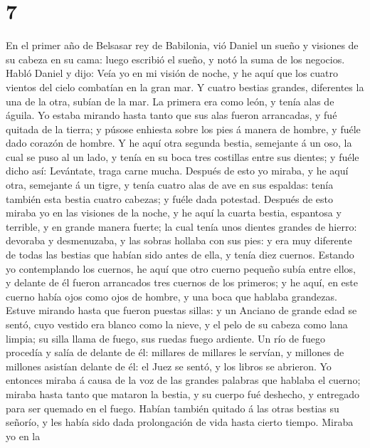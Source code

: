 \hypertarget{section-6}{%
\section{7}\label{section-6}}

 En el primer año de Belsasar rey de Babilonia, vió Daniel
un sueño y visiones de su cabeza en su cama: luego escribió el sueño, y
notó la suma de los negocios.  Habló Daniel y dijo: Veía yo
en mi visión de noche, y he aquí que los cuatro vientos del cielo
combatían en la gran mar.  Y cuatro bestias grandes,
diferentes la una de la otra, subían de la mar.  La primera
era como león, y tenía alas de águila. Yo estaba mirando hasta tanto que
sus alas fueron arrancadas, y fué quitada de la tierra; y púsose
enhiesta sobre los pies á manera de hombre, y fuéle dado corazón de
hombre.  Y he aquí otra segunda bestia, semejante á un oso,
la cual se puso al un lado, y tenía en su boca tres costillas entre sus
dientes; y fuéle dicho así: Levántate, traga carne mucha. 
Después de esto yo miraba, y he aquí otra, semejante á un tigre, y tenía
cuatro alas de ave en sus espaldas: tenía también esta bestia cuatro
cabezas; y fuéle dada potestad.  Después de esto miraba yo
en las visiones de la noche, y he aquí la cuarta bestia, espantosa y
terrible, y en grande manera fuerte; la cual tenía unos dientes grandes
de hierro: devoraba y desmenuzaba, y las sobras hollaba con sus pies: y
era muy diferente de todas las bestias que habían sido antes de ella, y
tenía diez cuernos.  Estando yo contemplando los cuernos, he
aquí que otro cuerno pequeño subía entre ellos, y delante de él fueron
arrancados tres cuernos de los primeros; y he aquí, en este cuerno había
ojos como ojos de hombre, y una boca que hablaba grandezas. 
Estuve mirando hasta que fueron puestas sillas: y un Anciano de grande
edad se sentó, cuyo vestido era blanco como la nieve, y el pelo de su
cabeza como lana limpia; su silla llama de fuego, sus ruedas fuego
ardiente.  Un río de fuego procedía y salía de delante de
él: millares de millares le servían, y millones de millones asistían
delante de él: el Juez se sentó, y los libros se abrieron. 
Yo entonces miraba á causa de la voz de las grandes palabras que hablaba
el cuerno; miraba hasta tanto que mataron la bestia, y su cuerpo fué
deshecho, y entregado para ser quemado en el fuego.  Habían
también quitado á las otras bestias su señorío, y les había sido dada
prolongación de vida hasta cierto tiempo.  Miraba yo en la
